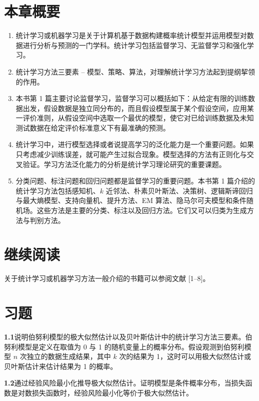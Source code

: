 \documentclass[UTF8,12pt,a4paper,fontset=fandol]{ctexart}
\begin{document}
\section*{本章概要}

\begin{enumerate}
  \item 统计学习或机器学习是关于计算机基于数据构建概率统计模型并运用模型对数据进行分析与预测的一门学科。统计学习包括监督学习、无监督学习和强化学习。
  \item 统计学习方法三要素 -- 模型、策略、算法，对理解统计学习方法起到提纲挈领的作用。
  \item 本书第 1 篇主要讨论监督学习，监督学习可以概括如下：从给定有限的训练数据出发，假设数据是独立同分布的，而且假设模型属于某个假设空间，应用某一评价准则，从假设空间中选取一个最优的模型，使它对已给训练数据及未知测试数据在给定评价标准意义下有最准确的预测。
  \item 统计学习中，进行模型选择或者说提高学习的泛化能力是一个重要问题。如果只考虑减少训练误差，就可能产生过拟合现象。模型选择的方法有正则化与交叉验证。学习方法泛化能力的分析是统计学习理论研究的重要课题。
  \item 分类问题、标注问题和回归问题都是监督学习的重要问题。本书第 1 篇介绍的统计学习方法包括感知机、$k$ 近邻法、朴素贝叶斯法、决策树、逻辑斯谛回归与最大熵模型、支持向量机、提升方法、EM 算法、隐马尔可夫模型和条件随机场。这些方法是主要的分类、标注以及回归方法。它们又可以归类为生成方法与判别方法。
\end{enumerate}

\section*{继续阅读}

关于统计学习或机器学习方法一般介绍的书籍可以参阅文献 [1--8]。

\section*{习题}

\noindent\textbf{1.1}\quad 说明伯努利模型的极大似然估计以及贝叶斯估计中的统计学习方法三要素。伯努利模型是定义在取值为 0 与 1 的随机变量上的概率分布。假设观测到伯努利模型 $n$ 次独立的数据生成结果，其中 $k$ 次的结果为 1，这时可以用极大似然估计或贝叶斯估计来估计结果为 1 的概率。

\noindent\textbf{1.2}\quad 通过经验风险最小化推导极大似然估计。证明模型是条件概率分布，当损失函数是对数损失函数时，经验风险最小化等价于极大似然估计。
\end{document}
